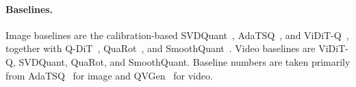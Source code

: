 \paragraph{Baselines.}
Image baselines are the calibration-based SVDQuant~\cite{li2024svdquant}, AdaTSQ~\cite{zhang2026adatsq}, and ViDiT-Q~\cite{zhao2024vidit}, together with Q-DiT~\cite{chen2025q}, QuaRot~\cite{ashkboos2024quarot}, and SmoothQuant~\cite{xiao2023smoothquant}. Video baselines are ViDiT-Q, SVDQuant, QuaRot, and SmoothQuant. Baseline numbers are taken primarily from AdaTSQ~\cite{zhang2026adatsq} for image and QVGen~\cite{huang2025qvgen} for video.







